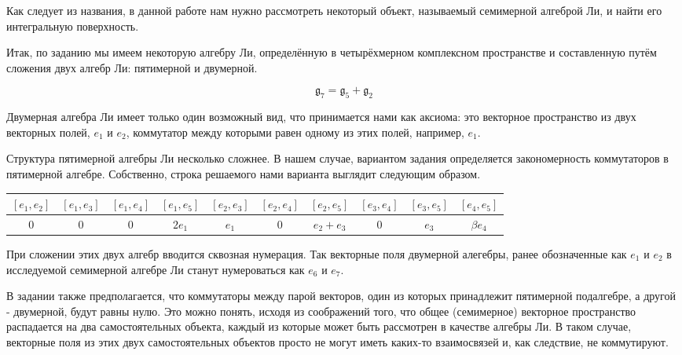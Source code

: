 \documentclass[a4paper]{article}
\begin{document}
Как следует из названия, в данной работе нам нужно рассмотреть некоторый объект, называемый семимерной алгеброй Ли, и найти его интегральную поверхность.

Итак, по заданию мы имеем некоторую алгебру Ли, определённую в четырёхмерном комплексном пространстве и составленную путём сложения двух алгебр Ли: пятимерной и двумерной.

\begin{equation}
\mathfrak{g}_{7} = \mathfrak{g}_{5} + \mathfrak{g}_{2}
\end{equation}

Двумерная алгебра Ли имеет только один возможный вид, что принимается нами как аксиома: это векторное пространство из двух векторных полей, $e_{1}$ и $e_{2}$, коммутатор между которыми равен одному из этих полей, например, $e_{1}$.

Структура пятимерной алгебры Ли несколько сложнее. В нашем случае, вариантом задания определяется закономерность коммутаторов в пятимерной алгебре. Собственно, строка решаемого нами варианта выглядит следующим образом.

\begin{table}[h]
\begin{center}
\begin{tabular}{|c|c|c|c|c|c|c|c|c|c|}
\hline
$[e_{1},e_{2}]$ & $[e_{1},e_{3}]$ & $[e_{1},e_{4}]$ & \cellcolor{honey} $[e_{1},e_{5}]$ & \cellcolor{honey} $[e_{2},e_{3}]$ & $[e_{2},e_{4}]$ & \cellcolor{honey} $[e_{2},e_{5}]$ & $[e_{3},e_{4}]$ & \cellcolor{honey} $[e_{3},e_{5}]$ & \cellcolor{honey} $[e_{4},e_{5}]$ \\
\hline
 $0$ & $0$ & $0$ & $2e_{1}$ &  $e_{1}$ & $0$ & $e_{2}+e_{3}$ & $0$ & $e_{3}$ &  $\beta e_{4}$ \\
\hline
\end{tabular}
\end{center}
\end{table}

При сложении этих двух алгебр вводится сквозная нумерация. Так векторные поля двумерной алегебры, ранее обозначенные как $e_{1}$ и $e_{2}$ в исследуемой семимерной алгебре Ли станут нумероваться как $e_{6}$ и $e_{7}$.

В задании также предполагается, что коммутаторы между парой векторов, один из которых принадлежит пятимерной подалгебре, а другой - двумерной, будут равны нулю. Это можно понять, исходя из соображений того, что общее (семимерное) векторное пространство распадается на два самостоятельных объекта, каждый из которые может быть рассмотрен в качестве алгебры Ли. В таком случае, векторные поля из этих двух самостоятельных объектов просто не могут иметь каких-то взаимосвязей и, как следствие, не коммутируют.
\end{document}

